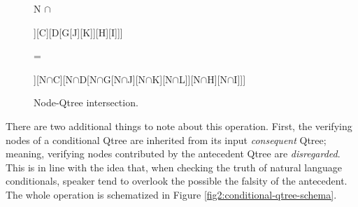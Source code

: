 \begin{figure}[H]
	\begin{center}
		\begin{minipage}[c]{.05\linewidth}
			\centering
			N $\cap$
		\end{minipage}
		\begin{minipage}[c]{.25\linewidth}
			\centering
			\begin{forest}
				[A[B[E][F]][C][D[G[J][K]][H][I]]]
			\end{forest}
		\end{minipage}
		\begin{minipage}[c]{.05\linewidth}
			\centering
			=
		\end{minipage}
		\begin{minipage}[c]{.35\linewidth}
			\centering
			\begin{forest}
				[N$\cap$A[N$\cap$B[N$\cap$E][N$\cap$F]][N$\cap$C][N$\cap$D[N$\cap$G[N$\cap$J][N$\cap$K][N$\cap$L]][N$\cap$H][N$\cap$I]]]
			\end{forest}
		\end{minipage}
	\end{center}
	\caption{Node-Qtree intersection.}\label{fig2:node-qtree-inter}
\end{figure}
	
	
There are two additional things to note about this operation.
First, the verifying nodes of a conditional Qtree are inherited from its input \textit{consequent} Qtree; meaning, verifying nodes contributed by the antecedent Qtree are \textit{disregarded}. This is in line with the idea that, when checking the truth of natural language conditionals, speaker tend to overlook the possible the falsity of the antecedent. The whole operation is schematized in Figure \ref{fig2:conditional-qtree-schema}.

